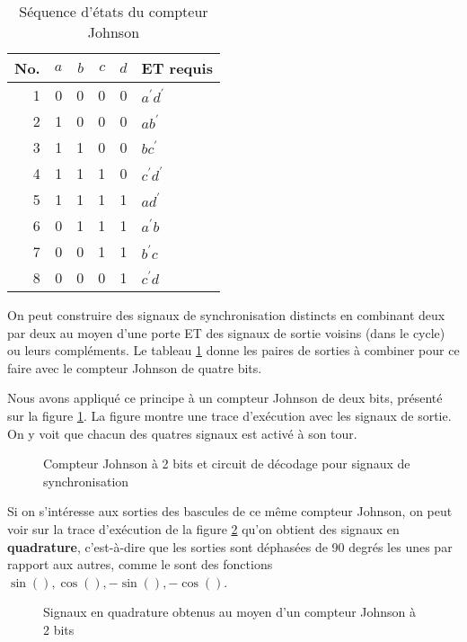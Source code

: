 \documentclass[11pt]{article}
\begin{document}
\begin{table}[htbp]
\caption{\label{tab:org40a147b}Séquence d'états du compteur Johnson}
\centering
\begin{tabular}{rrrrrl}
No. & \(a\) & \(b\) & \(c\) & \(d\) & ET requis\\
\hline
1 & 0 & 0 & 0 & 0 & \(a^\prime d^\prime\)\\
2 & 1 & 0 & 0 & 0 & \(a b^\prime\)\\
3 & 1 & 1 & 0 & 0 & \(b c^\prime\)\\
4 & 1 & 1 & 1 & 0 & \(c^\prime d^\prime\)\\
5 & 1 & 1 & 1 & 1 & \(a d^\prime\)\\
6 & 0 & 1 & 1 & 1 & \(a^\prime b\)\\
7 & 0 & 0 & 1 & 1 & \(b^\prime c\)\\
8 & 0 & 0 & 0 & 1 & \(c^\prime d\)\\
\end{tabular}
\end{table}


On peut construire des signaux de synchronisation distincts en
combinant deux par deux au moyen d'une porte ET des signaux de sortie
voisins (dans le cycle) ou leurs compléments. Le tableau \ref{tab:org40a147b}
donne les paires de sorties à combiner pour ce faire avec le compteur
Johnson de quatre bits.

Nous avons appliqué ce principe à un compteur Johnson de deux bits,
présenté sur la figure \ref{fig:org02c86db}. La figure montre une trace
d'exécution avec les signaux de sortie. On y voit que chacun des
quatres signaux est activé à son tour.

\begin{figure}[htbp]
\centering

\caption{\label{fig:org02c86db}Compteur Johnson à 2 bits et circuit de décodage pour signaux de synchronisation}
\end{figure}

Si on s'intéresse aux sorties des bascules de ce même compteur
Johnson, on peut voir sur la trace d'exécution de la figure
\ref{fig:orgeaefa08} qu'on obtient des signaux en \textbf{quadrature},
c'est-à-dire que les sorties sont déphasées de 90 degrés les unes par
rapport aux autres, comme le sont des fonctions \(\sin(), \cos(),
-\sin(), -\cos()\).

\begin{figure}[htbp]
\centering

\caption{\label{fig:orgeaefa08}Signaux en quadrature obtenus au moyen d'un compteur Johnson à 2 bits}
\end{figure} 
\end{document}
